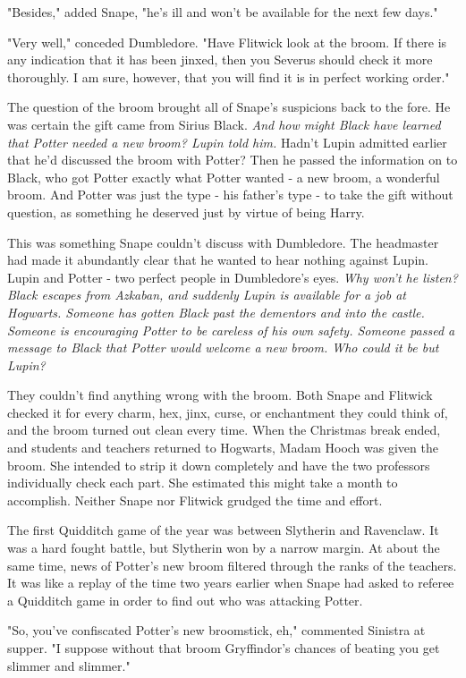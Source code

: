 "Besides," added Snape, "he's ill and won't be available for the next few days."

"Very well," conceded Dumbledore. "Have Flitwick look at the broom. If there is any indication that it has been jinxed, then you Severus should check it more thoroughly. I am sure, however, that you will find it is in perfect working order."

The question of the broom brought all of Snape's suspicions back to the fore. He was certain the gift came from Sirius Black. \emph{And how might Black have learned that Potter needed a new broom? Lupin told him.} Hadn't Lupin admitted earlier that he'd discussed the broom with Potter? Then he passed the information on to Black, who got Potter exactly what Potter wanted - a new broom, a wonderful broom. And Potter was just the type - his father's type - to take the gift without question, as something he deserved just by virtue of being Harry.

This was something Snape couldn't discuss with Dumbledore. The headmaster had made it abundantly clear that he wanted to hear nothing against Lupin. Lupin and Potter - two perfect people in Dumbledore's eyes. \emph{Why won't he listen? Black escapes from Azkaban, and suddenly Lupin is available for a job at Hogwarts. Someone has gotten Black past the dementors and into the castle. Someone is encouraging Potter to be careless of his own safety. Someone passed a message to Black that Potter would welcome a new broom. Who could it be but Lupin?}

They couldn't find anything wrong with the broom. Both Snape and Flitwick checked it for every charm, hex, jinx, curse, or enchantment they could think of, and the broom turned out clean every time. When the Christmas break ended, and students and teachers returned to Hogwarts, Madam Hooch was given the broom. She intended to strip it down completely and have the two professors individually check each part. She estimated this might take a month to accomplish. Neither Snape nor Flitwick grudged the time and effort.

The first Quidditch game of the year was between Slytherin and Ravenclaw. It was a hard fought battle, but Slytherin won by a narrow margin. At about the same time, news of Potter's new broom filtered through the ranks of the teachers. It was like a replay of the time two years earlier when Snape had asked to referee a Quidditch game in order to find out who was attacking Potter.

"So, you've confiscated Potter's new broomstick, eh," commented Sinistra at supper. "I suppose without that broom Gryffindor's chances of beating you get slimmer and slimmer."

